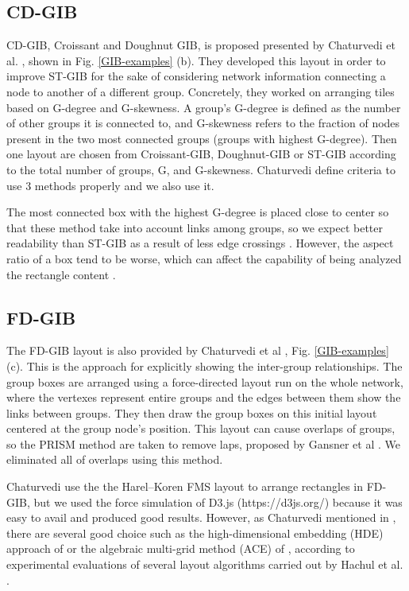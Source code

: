 \documentclass{llncs}
\begin{document}
\subsection{CD-GIB}
CD-GIB, Croissant and Doughnut GIB, is proposed presented by Chaturvedi et al. \cite{chatu}, shown in Fig. \ref{GIB-examples} (b).
They developed this layout in order to improve ST-GIB for the sake of considering network information connecting a node to another of a different group. Concretely, they worked on arranging tiles based on G-degree and G-skewness.
A group's G-degree is defined as the number of other groups it is connected to, and G-skewness refers to the fraction of nodes present in the two most connected groups (groups with highest G-degree).
Then one layout are chosen from Croissant-GIB, Doughnut-GIB or ST-GIB according to the total number of groups, G, and G-skewness.
Chaturvedi define criteria to use 3 methods properly and we also use it.


The most connected box with the highest G-degree is placed close to center so that these method take into account links among groups, so we expect better readability than ST-GIB as a result of less edge crossings \cite{becker,pur97,pur98,pca}.
However, the aspect ratio of a box tend to be worse, which can affect the capability of being analyzed the rectangle content \cite{bruls}.


\subsection{FD-GIB}
The FD-GIB layout is also provided by Chaturvedi et al \cite{chatu}, Fig. \ref{GIB-examples} (c).
This is the approach for explicitly showing the inter-group relationships.
The group boxes are arranged using a force-directed layout run on the whole network, where the vertexes represent entire groups and the edges between them show the links between groups.
They then draw the group boxes on this initial layout centered at the group node’s position.
This layout can cause overlaps of groups, so the PRISM method are taken to remove laps, proposed by Gansner et al \cite{gansner}.
We eliminated all of overlaps using this method.

Chaturvedi use the the Harel–Koren FMS layout \cite{harel-koren} to arrange rectangles in FD-GIB, but we used the force simulation of D3.js (https://d3js.org/) because it was easy to avail and produced good results.
However, as Chaturvedi mentioned in \cite{chatu}, there are several good choice such as the high-dimensional embedding (HDE) approach of \cite{harel} or the algebraic multi-grid method (ACE) of \cite{koren}, according to experimental evaluations of several layout algorithms carried out by Hachul et al. \cite{hachul1,hachul2}.
\end{document}
